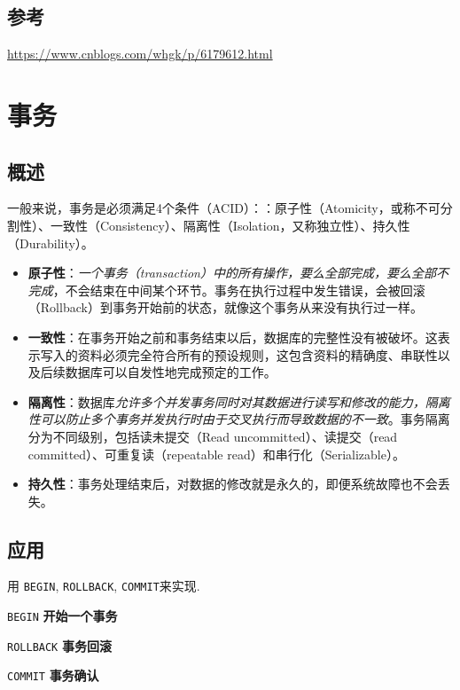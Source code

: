 \documentclass[UTF8,a4paper,12pt]{ctexbook}
\begin{document}
	\section{参考}
		\url{https://www.cnblogs.com/whgk/p/6179612.html}
			
	
	
\chapter{事务}
	\section{概述}
		一般来说，事务是必须满足4个条件（ACID）：：原子性（Atomicity，或称不可分割性）、一致性（Consistency）、隔离性（Isolation，又称独立性）、持久性（Durability）。
		
		\begin{itemize}
			\item \textbf{原子性}：\textit{一个事务（transaction）中的所有操作，要么全部完成，要么全部不完成}，不会结束在中间某个环节。事务在执行过程中发生错误，会被回滚（Rollback）到事务开始前的状态，就像这个事务从来没有执行过一样。
			\item \textbf{一致性}：在事务开始之前和事务结束以后，数据库的完整性没有被破坏。这表示写入的资料必须完全符合所有的预设规则，这包含资料的精确度、串联性以及后续数据库可以自发性地完成预定的工作。
			\item \textbf{隔离性}：数据库\textit{允许多个并发事务同时对其数据进行读写和修改的能力，隔离性可以防止多个事务并发执行时由于交叉执行而导致数据的不一致}。事务隔离分为不同级别，包括读未提交（Read uncommitted）、读提交（read committed）、可重复读（repeatable read）和串行化（Serializable）。
			\item \textbf{持久性}：事务处理结束后，对数据的修改就是永久的，即便系统故障也不会丢失。
		\end{itemize}
	
	\section{应用}
		用 \verb|BEGIN|, \verb|ROLLBACK|, \verb|COMMIT|来实现.
		
		\verb|BEGIN| \textbf{开始一个事务}
		
		\verb|ROLLBACK| \textbf{事务回滚}
		
		\verb|COMMIT| \textbf{事务确认}
		
\end{document}
